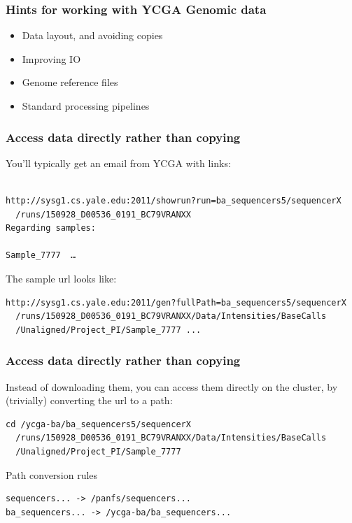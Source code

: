 \documentclass[10pt]{beamer}
\begin{document}
\begin{frame}[fragile]
\frametitle{Hints for working with YCGA Genomic data}
\begin{itemize}
\item Data layout, and avoiding copies
\item Improving IO
\item Genome reference files
\item Standard processing pipelines
\end{itemize}
\end{frame}

\begin{frame}[fragile]
\frametitle{Access data directly rather than copying}

You'll typically get an email from YCGA with links:

\begin{verbatim}

http://sysg1.cs.yale.edu:2011/showrun?run=ba_sequencers5/sequencerX 
  /runs/150928_D00536_0191_BC79VRANXX 
Regarding samples:

Sample_7777  …
\end{verbatim}

The sample url looks like:

\begin{verbatim}
http://sysg1.cs.yale.edu:2011/gen?fullPath=ba_sequencers5/sequencerX
  /runs/150928_D00536_0191_BC79VRANXX/Data/Intensities/BaseCalls
  /Unaligned/Project_PI/Sample_7777 ...

\end{verbatim}
\end{frame}


\begin{frame}[fragile]
\frametitle{Access data directly rather than copying}

Instead of downloading them, you can access them directly on the cluster, by (trivially) 
converting the url to a path:

\begin{verbatim}
cd /ycga-ba/ba_sequencers5/sequencerX
  /runs/150928_D00536_0191_BC79VRANXX/Data/Intensities/BaseCalls
  /Unaligned/Project_PI/Sample_7777
\end{verbatim}

Path conversion rules
\begin{verbatim}
sequencers... -> /panfs/sequencers...
ba_sequencers... -> /ycga-ba/ba_sequencers...
\end{verbatim}

\end{frame}
\end{document}
